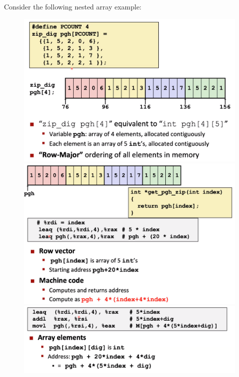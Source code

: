 \documentclass[12pt]{book}
\begin{document}
Consider the following nested array example:
\begin{figure}[h]
        \centering
        \includegraphics[scale = 0.2]{./figures/nestedArrayEx}
        \includegraphics[scale = 0.2]{./figures/nestedArrayEx2}
        \includegraphics[scale = 0.2]{./figures/nestedArrayEx3}
\end{figure}
\end{document}
